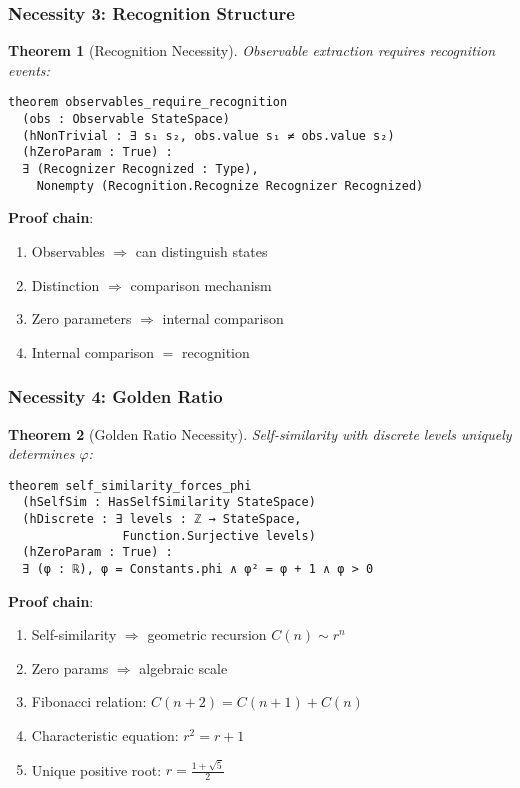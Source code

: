 \documentclass[11pt]{article}
\newtheorem{theorem}{Theorem}[section]
\theoremstyle{definition}
\theoremstyle{remark}
\begin{document}
\subsubsection{Necessity 3: Recognition Structure}

\begin{theorem}[Recognition Necessity]
\label{thm:recognition-necessity}
Observable extraction requires recognition events:
\begin{lstlisting}[language=lean]
theorem observables_require_recognition
  (obs : Observable StateSpace)
  (hNonTrivial : ∃ s₁ s₂, obs.value s₁ ≠ obs.value s₂)
  (hZeroParam : True) :
  ∃ (Recognizer Recognized : Type),
    Nonempty (Recognition.Recognize Recognizer Recognized)
\end{lstlisting}
\end{theorem}

\textbf{Proof chain}:
\begin{enumerate}
\item Observables $\Rightarrow$ can distinguish states
\item Distinction $\Rightarrow$ comparison mechanism
\item Zero parameters $\Rightarrow$ internal comparison
\item Internal comparison $=$ recognition
\end{enumerate}

\subsubsection{Necessity 4: Golden Ratio}

\begin{theorem}[Golden Ratio Necessity]
\label{thm:phi-necessity}
Self-similarity with discrete levels uniquely determines $\varphi$:
\begin{lstlisting}[language=lean]
theorem self_similarity_forces_phi
  (hSelfSim : HasSelfSimilarity StateSpace)
  (hDiscrete : ∃ levels : ℤ → StateSpace,
                Function.Surjective levels)
  (hZeroParam : True) :
  ∃ (φ : ℝ), φ = Constants.phi ∧ φ² = φ + 1 ∧ φ > 0
\end{lstlisting}
\end{theorem}

\textbf{Proof chain}:
\begin{enumerate}
\item Self-similarity $\Rightarrow$ geometric recursion $C(n) \sim r^n$
\item Zero params $\Rightarrow$ algebraic scale
\item Fibonacci relation: $C(n+2) = C(n+1) + C(n)$
\item Characteristic equation: $r^2 = r + 1$
\item Unique positive root: $r = \frac{1+\sqrt{5}}{2}$
\end{enumerate}
\end{document}
